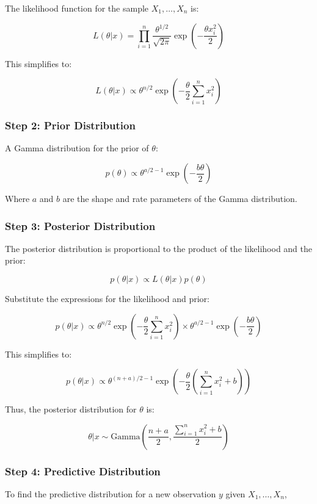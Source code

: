 \documentclass{article}
\begin{document}
The likelihood function for the sample \( X_1, \dots, X_n \) is:

\[
L(\theta | x) = \prod_{i=1}^{n} \frac{\theta^{1/2}}{\sqrt{2\pi}} \exp \left( -\frac{\theta x_i^2}{2} \right)
\]

This simplifies to:

\[
L(\theta | x) \propto \theta^{n/2} \exp \left( -\frac{\theta}{2} \sum_{i=1}^{n} x_i^2 \right)
\]

\subsubsection*{Step 2: Prior Distribution}

A Gamma distribution for the prior of \( \theta \):

\[
p(\theta) \propto \theta^{a/2 - 1} \exp \left( -\frac{b \theta}{2} \right)
\]

Where \( a \) and \( b \) are the shape and rate parameters of the Gamma distribution.

\subsubsection*{Step 3: Posterior Distribution}

The posterior distribution is proportional to the product of the likelihood and the prior:

\[
p(\theta | x) \propto L(\theta | x) p(\theta)
\]

Substitute the expressions for the likelihood and prior:

\[
p(\theta | x) \propto \theta^{n/2} \exp \left( -\frac{\theta}{2} \sum_{i=1}^{n} x_i^2 \right) \times \theta^{a/2 - 1} \exp \left( -\frac{b \theta}{2} \right)
\]

This simplifies to:

\[
p(\theta | x) \propto \theta^{(n + a)/2 - 1} \exp \left( -\frac{\theta}{2} \left( \sum_{i=1}^{n} x_i^2 + b \right) \right)
\]

Thus, the posterior distribution for \( \theta \) is:

\[
\theta | x \sim \text{Gamma}\left( \frac{n + a}{2}, \frac{\sum_{i=1}^{n} x_i^2 + b}{2} \right)
\]

\subsubsection*{Step 4: Predictive Distribution}

To find the predictive distribution for a new observation \( y \) given \( X_1, \dots, X_n \), 
\end{document}
